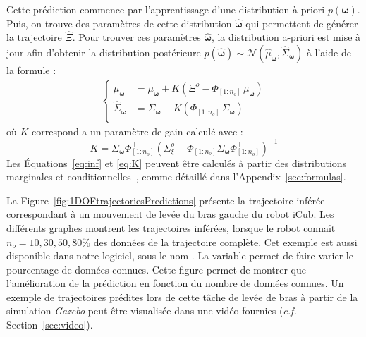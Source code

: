 \documentclass[utf8]{frontiersSCNS} %
\begin{document}
Cette prédiction commence par l'apprentissage d'une distribution à-priori $p(\boldsymbol{\omega})$. Puis, on trouve des paramètres de cette distribution $\hat{\boldsymbol{\omega}}$ qui permettent de générer la trajectoire $\hat{\Xi}$. Pour trouver ces paramètres $\hat{\boldsymbol{\omega}}$, la distribution a-priori est mise à jour afin d'obtenir la distribution postérieure $p(\hat{\boldsymbol{\omega}}) \sim \mathcal{N}(\hat{\mu}_{\boldsymbol{\omega}},\hat{\Sigma}_{\boldsymbol{\omega}})$ à l'aide de la formule :
\begin{eqnarray} \label{eq:inf}
\left\{
\begin{array}{rl}
\hat{\mu}_{\boldsymbol{\omega}} &= \mu_{\boldsymbol{\omega}} + K(\Xi^o - \Phi_{[1:n_o]} \, \mu_{\boldsymbol{\omega}}) \\ 
\hat{\Sigma}_{\boldsymbol{\omega}} &= \Sigma_{\boldsymbol{\omega}} - K(\Phi_{[1:n_o]} \, \Sigma_{\boldsymbol{\omega}}) \\
\end{array}
\right.
\end{eqnarray}
où $K$ correspond a un paramètre de gain calculé avec :
\begin{equation}\label{eq:K}
K= \Sigma_{\boldsymbol{\omega}}\Phi_{[1:n_o]}^\top(\Sigma_\xi^o + \Phi_{[1:n_o]}\Sigma_{\boldsymbol{\omega}} \Phi_{[1:n_o]}^\top)^{-1}
\end{equation}
Les Équations~\ref{eq:inf} et \ref{eq:K} peuvent être calculés à partir des distributions marginales et conditionnelles~\cite{paraschos2013probabilistic, Bishop:2006}, comme détaillé dans l'Appendix~\ref{sec:formulas}.


La Figure~\ref{fig:1DOFtrajectoriesPredictions} présente la trajectoire inférée correspondant à un mouvement de levée du bras gauche du robot iCub. Les différents graphes montrent les trajectoires inférées, lorsque le robot connaît $n_{o}=10,30,50,80\%$ des données de la trajectoire complète. Cet exemple est aussi disponible dans notre logiciel, sous le nom . 
La variable  permet de faire varier le pourcentage de données connues. Cette figure permet de montrer que l'amélioration de la prédiction en fonction du nombre de données connues. Un exemple de trajectoires prédites lors de cette tâche de levée de bras à partir de la simulation \textit{Gazebo} peut être visualisée dans une vidéo fournies (\textit{c.f.} Section~\ref{sec:video}).
\end{document}

